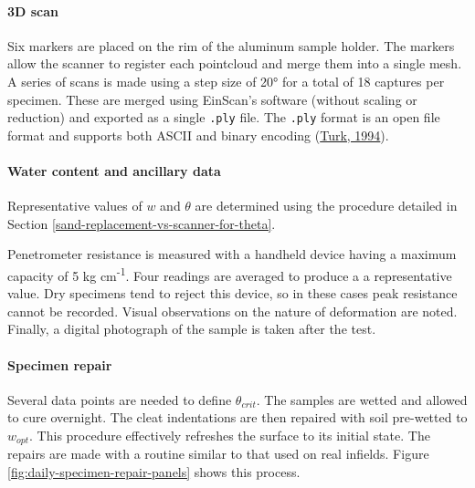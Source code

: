 \documentclass[
  letterpaper,
  openany]{book}
\begin{document}
\hypertarget{cleat-mark-specimen-3D-scanning}{%
\paragraph{3D scan}\label{cleat-mark-specimen-3D-scanning}}

Six markers are placed on the rim of the aluminum sample holder.
The markers allow the scanner to register each pointcloud and merge them into a single mesh.
A series of scans is made using a step size of 20° for a total of 18 captures per specimen.
These are merged using EinScan's software (without scaling or reduction) and exported as a single \texttt{.ply} file.
The \texttt{.ply} format is an open file format and supports both ASCII and binary encoding (\protect\hyperlink{ref-Turk1994}{Turk, 1994}).

\hypertarget{water-content-and-ancillary-data}{%
\paragraph{Water content and ancillary data}\label{water-content-and-ancillary-data}}

Representative values of \(w\) and \(\theta\) are determined using the procedure detailed in Section \ref{sand-replacement-vs-scanner-for-theta}.

Penetrometer resistance is measured with a handheld device having a maximum capacity of 5 kg cm\textsuperscript{-1}.
Four readings are averaged to produce a a representative value.
Dry specimens tend to reject this device, so in these cases peak resistance cannot be recorded.
Visual observations on the nature of deformation are noted.
Finally, a digital photograph of the sample is taken after the test.

\hypertarget{specimen-repair}{%
\paragraph{Specimen repair}\label{specimen-repair}}

Several data points are needed to define \(\theta_{crit}\).
The samples are wetted and allowed to cure overnight.
The cleat indentations are then repaired with soil pre-wetted to \(w_{opt}\).
This procedure effectively refreshes the surface to its initial state.
The repairs are made with a routine similar to that used on real infields.
Figure \ref{fig:daily-specimen-repair-panels} shows this process.
\end{document}
